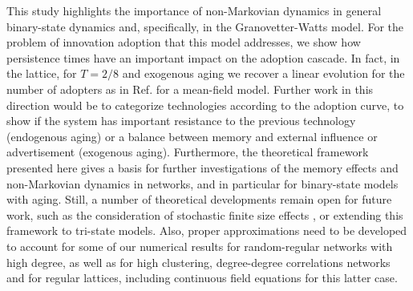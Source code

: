This study highlights the importance of non-Markovian dynamics in general  binary-state dynamics and, specifically, in the Granovetter-Watts model. For the problem of innovation adoption that this model addresses, we show how persistence times have an important impact on the adoption cascade. In fact, in the lattice, for $T = 2/8$ and exogenous aging we recover a linear evolution for the number of adopters as in Ref. \cite{goncalves-2012} for a mean-field model. Further work in this direction would be to categorize technologies according to the adoption curve, to show if the system has important resistance to the previous technology (endogenous aging) or a balance between memory and external influence or advertisement (exogenous aging). Furthermore, the theoretical framework presented here gives a basis for further investigations of the memory effects and non-Markovian dynamics in networks, and in particular for  binary-state models with aging. Still, a number of theoretical developments remain open for future work, such as the consideration of stochastic finite size effects \cite{peralta-2020B}, or extending this framework to tri-state models. Also, proper approximations need to be developed to account for some of our numerical results for random-regular networks with high degree, as well as for high clustering, degree-degree correlations networks and for regular lattices, including continuous field equations for this latter case. 
